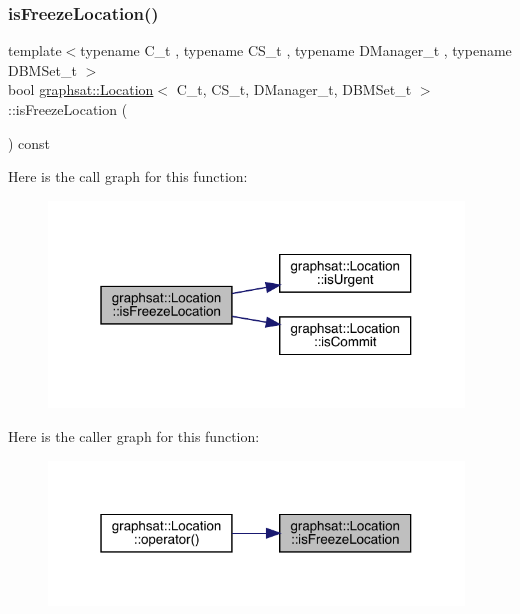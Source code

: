 \subsubsection{\texorpdfstring{isFreezeLocation()}{isFreezeLocation()}}
{\footnotesize\ttfamily template$<$typename C\+\_\+t , typename C\+S\+\_\+t , typename D\+Manager\+\_\+t , typename D\+B\+M\+Set\+\_\+t $>$ \\
bool \mbox{\hyperlink{classgraphsat_1_1_location}{graphsat\+::\+Location}}$<$ C\+\_\+t, C\+S\+\_\+t, D\+Manager\+\_\+t, D\+B\+M\+Set\+\_\+t $>$\+::is\+Freeze\+Location (\begin{DoxyParamCaption}{ }\end{DoxyParamCaption}) const\hspace{0.3cm}{\ttfamily [inline]}}

Here is the call graph for this function\+:
\nopagebreak
\begin{figure}[H]
\begin{center}
\leavevmode
\includegraphics[width=313pt]{classgraphsat_1_1_location_a061c74b681729ae1fbb38802e394eef6_cgraph}
\end{center}
\end{figure}
Here is the caller graph for this function\+:
\nopagebreak
\begin{figure}[H]
\begin{center}
\leavevmode
\includegraphics[width=313pt]{classgraphsat_1_1_location_a061c74b681729ae1fbb38802e394eef6_icgraph}
\end{center}
\end{figure}
\mbox{\label{classgraphsat_1_1_location_a5cb2c4a3420724f44a1c942d2d6ca213}} 
